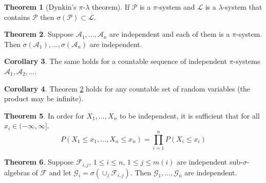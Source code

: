 \documentclass{article}
\theoremstyle{definition}
\newtheorem{theorem}{Theorem}[section]
\newtheorem{corollary}[theorem]{Corollary}
\begin{document}
\begin{theorem}[Dynkin's $\pi$-$\lambda$ theorem]
    If $\mathcal{P}$ is a $\pi$-system and $\mathcal{L}$ is a $\lambda$-system that contains $\mathcal{P}$ then $\sigma(\mathcal{P}) \subset \mathcal{L}$.
\end{theorem}

\begin{theorem}\label{thm:set-independence-implies-sigma-Independence}
    Suppose $\mathcal{A}_1, \dots, \mathcal{A}_n$ are independent and each of them is a $\pi$-system. Then $\sigma(\mathcal{A}_1), \dots, \sigma(\mathcal{A}_n)$ are independent.
\end{theorem}

\begin{corollary}
    The same holds for a countable sequence of independent $\pi$-systems $\mathcal{A}_1, \mathcal{A}_2, \dots$.
\end{corollary}

\begin{corollary}
    Theorem \ref{thm:set-independence-implies-sigma-Independence} holds for any countable set of random variables (the product may be infinite).
\end{corollary}

\begin{theorem}
    In order for $X_1, \dots, X_n$ to be independent, it is sufficient that for all $x_i \in (-\infty, \infty]$.
    $$ P(X_1 \leq x_1, \dots, X_n \leq x_n) = \prod\limits_{i=1}^n P(X_i \leq x_i)$$
\end{theorem}


\begin{theorem}
    Suppose $\mathcal{F}_{i, j}$, $1 \leq i \leq n$, $1 \leq j \leq m(i)$ are independent sub-$\sigma$-algebras of $\mathcal{F}$ and let $\mathcal{G}_i = \sigma(\cup_j \mathcal{F}_{i, j})$. Then $\mathcal{G}_1, \dots, \mathcal{G}_n$ are independent.
\end{theorem}

\end{document}
